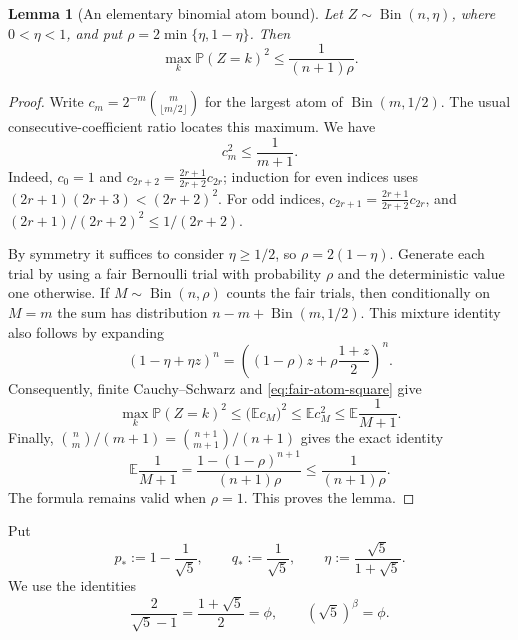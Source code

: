 \documentclass[11pt]{article}
\newtheorem{lemma}[theorem]{Lemma}
\theoremstyle{definition}
\theoremstyle{remark}
\newcommand{\E}{\mathbb E}
\newcommand{\Prb}{\mathbb P}
\begin{document}
\begin{lemma}[An elementary binomial atom bound]\label{lem:atom-bound}
Let $Z\sim\operatorname{Bin}(n,\eta)$, where $0<\eta<1$, and put
$\rho=2\min\{\eta,1-\eta\}$. Then
\begin{equation}\label{eq:atom-bound}
 \max_k\Prb(Z=k)^2\le\frac1{(n+1)\rho}.
\end{equation}
\end{lemma}
\begin{proof}
Write $c_m=2^{-m}\binom{m}{\lfloor m/2\rfloor}$ for the largest atom
of $\operatorname{Bin}(m,1/2)$. The usual consecutive-coefficient ratio
locates this maximum. We have
\begin{equation}\label{eq:fair-atom-square}
 c_m^2\le\frac1{m+1}.
\end{equation}
Indeed, $c_0=1$ and
$c_{2r+2}=\frac{2r+1}{2r+2}c_{2r}$; induction for even indices uses
$(2r+1)(2r+3)<(2r+2)^2$. For odd indices,
$c_{2r+1}=\frac{2r+1}{2r+2}c_{2r}$, and
$(2r+1)/(2r+2)^2\le1/(2r+2)$.

By symmetry it suffices to consider $\eta\ge1/2$, so
$\rho=2(1-\eta)$. Generate each trial by using a fair Bernoulli trial
with probability $\rho$ and the deterministic value one otherwise.
If $M\sim\operatorname{Bin}(n,\rho)$ counts the fair trials, then
conditionally on $M=m$ the sum has distribution
$n-m+\operatorname{Bin}(m,1/2)$. This mixture identity also follows by
expanding
\[
 (1-\eta+\eta z)^n
 =\left((1-\rho)z+\rho\frac{1+z}{2}\right)^n.
\]
Consequently, finite Cauchy--Schwarz and \eqref{eq:fair-atom-square} give
\[
 \max_k\Prb(Z=k)^2
 \le\bigl(\E c_M\bigr)^2
 \le\E c_M^2\le\E\frac1{M+1}.
\]
Finally, $\binom nm/(m+1)=\binom{n+1}{m+1}/(n+1)$ gives the exact identity
\[
 \E\frac1{M+1}
 =\frac{1-(1-\rho)^{n+1}}{(n+1)\rho}
 \le\frac1{(n+1)\rho}.
\]
The formula remains valid when $\rho=1$. This proves the lemma.
\end{proof}

Put
\begin{equation}\label{eq:tilting-constants}
 p_*:=1-\frac1{\sqrt5},\qquad q_*:=\frac1{\sqrt5},\qquad
 \eta:=\frac{\sqrt5}{1+\sqrt5}.
\end{equation}
We use the identities
\begin{equation}\label{eq:critical-identities}
 \frac2{\sqrt5-1}=\frac{1+\sqrt5}{2}=\phi,
 \qquad (\sqrt5)^\beta=\phi.
\end{equation}
\end{document}
